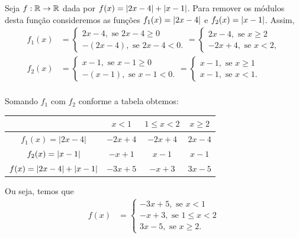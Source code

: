 \begin{exem}
  Seja $f: \mathbb{R} \rightarrow \mathbb{R}$ dada por $f(x)= \left|2x-4\right|+\left|x-1\right|$. Para remover os módulos desta função consideremos as funções $f_1(x)=\left|2x-4\right|$ e $f_2(x)=\left|x-1\right|$. Assim,
    \begin{align*}
        f_1(x)& = 
        \begin{cases}
         2x-4, \text{ se } 2x-4 \geq 0 \\
         -(2x-4), \text{ se } 2x-4 < 0.
        \end{cases}= 
        \begin{cases}
         2x-4, \text{ se } x \geq 2 \\
         -2x+4, \text{ se } x < 2,
        \end{cases} \\
        f_2(x)& = 
        \begin{cases}
         x-1, \text{ se } x-1 \geq 0 \\
         -(x-1), \text{ se } x-1 < 0.
        \end{cases}= 
        \begin{cases}
         x-1, \text{ se } x \geq 1 \\
         x-1, \text{ se } x < 1.
        \end{cases} \\
    \end{align*}

    Somando $f_1$ com $f_2$ conforme a tabela obtemos:   
    \begin{center}
    \begin{tabular}{cccc}
        & $x<1$ & $1\leq x <2$  & $x \geq 2$  \\ \midrule
        $f_1(x)=|2x-4|$ & $-2x+4$ & $-2x+4$ & $2x-4$ \\ \midrule
        $f_2(x)=\left|x-1\right|$ & $-x+1$ & $x-1$ & $x-1$\\ \midrule
        $f(x)=\left|2x-4\right|+\left|x-1\right|$ & $-3x+5$ & $-x+3$ & $3x-5$ \\
    \end{tabular}
    \end{center}

    Ou seja, temos que
    \begin{align*}
        f(x)& = 
        \begin{cases}
         -3x+5, \text{ se } x < 1 \\
         -x+3, \text{ se } 1\leq x<2 \\
         3x-5, \text{ se } x\geq 2.
        \end{cases}
    \end{align*}
    

\end{exem}
